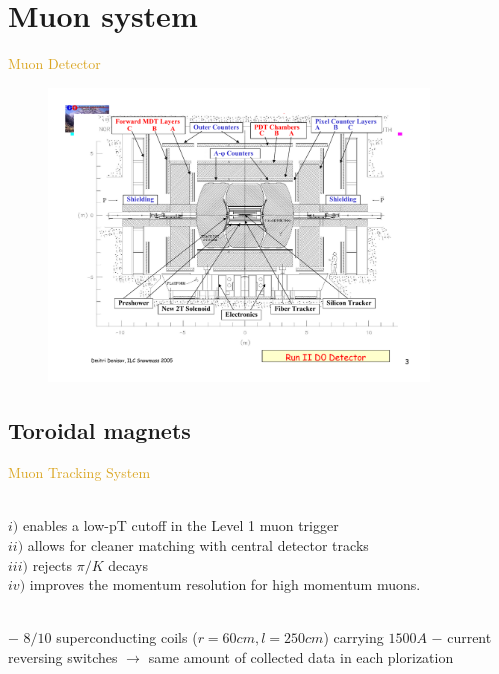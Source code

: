 
\section{Muon system}

\begin{frame}{\textcolor{Goldenrod}{Muon Detector}}
  \begin{overlayarea}{\textwidth}{\textheight}
    \begin{figure}[h]\centering
      \includegraphics[width=0.9\textwidth]{./Images/41_MD_layout_01}
    \end{figure}
  \end{overlayarea}
\end{frame}

\subsection{Toroidal magnets}
\begin{frame}{\textcolor{Goldenrod}{Muon Tracking System }}
  \begin{overlayarea}{\textwidth}{\textheight}
      
    \itt
  \item {}\\
    $i)$ enables a low-pT cutoff in the Level 1 muon trigger\\
    $ii)$ allows for cleaner matching with central detector tracks\\
    $iii)$ rejects $\pi/K$ decays\\
    $iv)$ improves the momentum resolution for high
    momentum muons.
  \item {}\\
    $-$ $8/10$ superconducting coils ($r = 60 cm, l = 250 cm$) carrying
    $1500 A$
    $-$ current reversing switches $\to $ same amount of collected
    data in each plorization
    \tti
  \end{overlayarea}
\end{frame}


